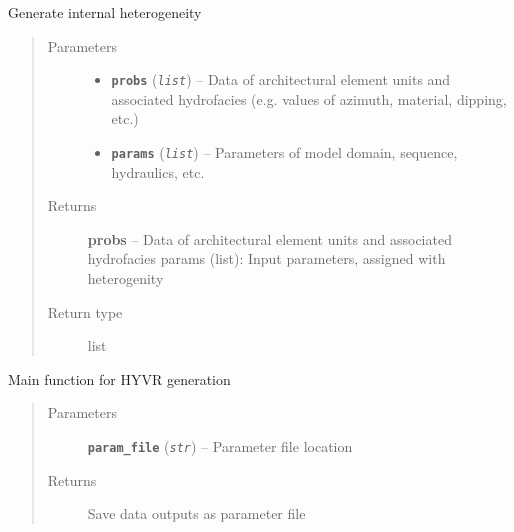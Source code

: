 \documentclass[letterpaper,10pt,english]{sphinxmanual}
\begin{document}
\begin{fulllineitems}
\label{hyvr:hyvr.hyvr.sim.heterogeneity}
Generate internal heterogeneity
\begin{quote}\begin{description}
\item[{Parameters}] \leavevmode\begin{itemize}
\item {} 
\textbf{\texttt{probs}} (\emph{\texttt{list}}) -- Data of architectural element units and associated hydrofacies (e.g. values of azimuth, material, dipping, etc.)

\item {} 
\textbf{\texttt{params}} (\emph{\texttt{list}}) -- Parameters of model domain, sequence, hydraulics, etc.

\end{itemize}

\item[{Returns}] \leavevmode
\textbf{probs} -- Data of architectural element units and associated hydrofacies
params (list):                  Input parameters, assigned with heterogenity

\item[{Return type}] \leavevmode
list

\end{description}\end{quote}

\end{fulllineitems}


\begin{fulllineitems}
\label{hyvr:hyvr.hyvr.sim.main}
Main function for HYVR generation
\begin{quote}\begin{description}
\item[{Parameters}] \leavevmode
\textbf{\texttt{param\_file}} (\emph{\texttt{str}}) -- Parameter file location

\item[{Returns}] \leavevmode
Save data outputs as parameter file

\end{description}\end{quote}

\end{fulllineitems}
\end{document}
